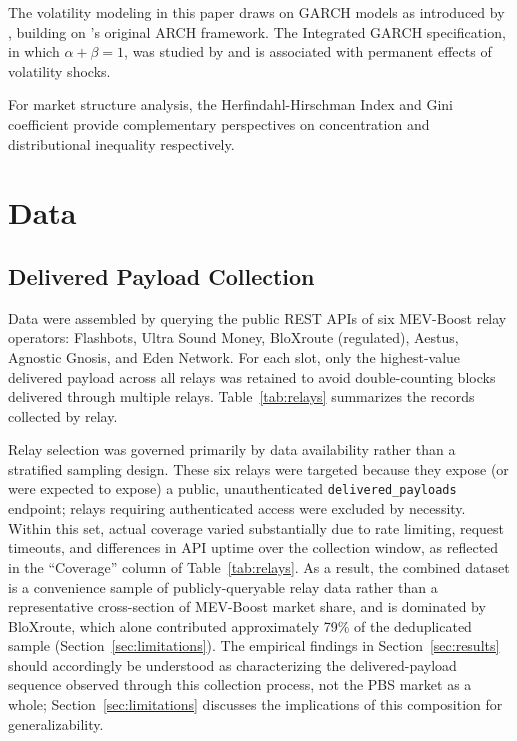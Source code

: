 \documentclass[11pt]{article}
\begin{document}
The volatility modeling in this paper draws on GARCH models as introduced by
\citet{bollerslev1986}, building on \citet{engle1982}'s original ARCH framework.
The Integrated GARCH specification, in which $\alpha + \beta = 1$, was studied
by \citet{engle_bollerslev1986} and is associated with permanent effects of
volatility shocks.

For market structure analysis, the Herfindahl-Hirschman Index
\citep{hirschman1945} and Gini coefficient \citep{gini1912} provide
complementary perspectives on concentration and distributional inequality
respectively.

\section{Data}
\label{sec:data}

\subsection{Delivered Payload Collection}

Data were assembled by querying the public REST APIs of six MEV-Boost relay
operators: Flashbots, Ultra Sound Money, BloXroute (regulated), Aestus,
Agnostic Gnosis, and Eden Network. For each slot, only the highest-value
delivered payload across all relays was retained to avoid double-counting blocks
delivered through multiple relays. Table~\ref{tab:relays} summarizes the records
collected by relay.

Relay selection was governed primarily by data availability rather than a
stratified sampling design. These six relays were targeted because they expose
(or were expected to expose) a public, unauthenticated \texttt{delivered\_payloads}
endpoint; relays requiring authenticated access were excluded by necessity.
Within this set, actual coverage varied substantially due to rate limiting,
request timeouts, and differences in API uptime over the collection window, as
reflected in the ``Coverage'' column of Table~\ref{tab:relays}. As a result,
the combined dataset is a convenience sample of publicly-queryable relay data
rather than a representative cross-section of MEV-Boost market share, and is
dominated by BloXroute, which alone contributed approximately 79\% of the
deduplicated sample (Section~\ref{sec:limitations}). The empirical findings in
Section~\ref{sec:results} should
accordingly be understood as characterizing the delivered-payload sequence
observed through this collection process, not the PBS market as a whole;
Section~\ref{sec:limitations} discusses the implications of this composition for
generalizability.
\end{document}
